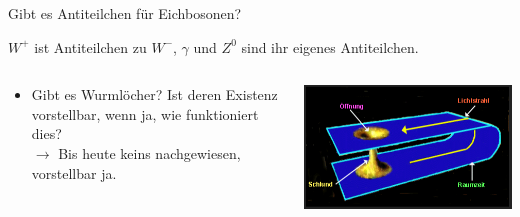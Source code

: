 \begin{frame}{Gibt es Antiteilchen für Eichbosonen?}

$W^+$ ist Antiteilchen zu $W^-$, $\gamma$ und $Z^0$ sind ihr eigenes Antiteilchen.

\vspace{0.5cm}

\begin{columns}[T, onlytextwidth]
  \begin{column}{0.47\textwidth}
    \begin{itemize}
      \setlength\itemsep{2em}
      \item Gibt es Wurmlöcher? Ist deren Existenz vorstellbar, wenn ja, wie funktioniert dies? \\
      $\longrightarrow$ Bis heute keins nachgewiesen, vorstellbar ja.
    \end{itemize}
  \end{column}
  \hfill
  \begin{column}{0.47\textwidth}
    \includegraphics[width=\textwidth]{images/Frage2.PNG}
  \end{column}
\end{columns}
\end{frame}

